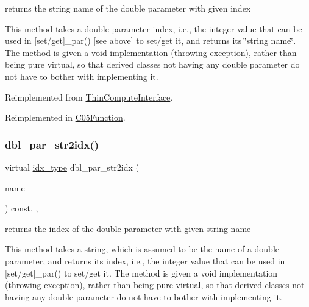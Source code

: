 returns the string name of the double parameter with given index 

This method takes a double parameter index, i.\+e., the integer value that can be used in \mbox{[}set/get\mbox{]}\+\_\+par() \mbox{[}see above\mbox{]} to set/get it, and returns its \char`\"{}string name\char`\"{}. The method is given a void implementation (throwing exception), rather than being pure virtual, so that derived classes not having any double parameter do not have to bother with implementing it. 

Reimplemented from \mbox{\hyperlink{class_s_m_spp__di__unipi__it_1_1_thin_compute_interface_a1be0e4ca13f9253674bc4fa7b67fe40e}{Thin\+Compute\+Interface}}.



Reimplemented in \mbox{\hyperlink{class_s_m_spp__di__unipi__it_1_1_c05_function_a93f1297e7910e91cc18b303376191026}{C05\+Function}}.

\mbox{\label{class_s_m_spp__di__unipi__it_1_1_function_a6d353ac3d1200d9bea89235da61bc4f3}} 
\subsubsection{\texorpdfstring{dbl\+\_\+par\+\_\+str2idx()}{dbl\_par\_str2idx()}}
{\footnotesize\ttfamily virtual \mbox{\hyperlink{class_s_m_spp__di__unipi__it_1_1_thin_compute_interface_aa3d710629ad8c434286726ad810c3b47}{idx\+\_\+type}} dbl\+\_\+par\+\_\+str2idx (\begin{DoxyParamCaption}\item[{const std\+::string \&}]{name }\end{DoxyParamCaption}) const\hspace{0.3cm}{\ttfamily [inline]}, {\ttfamily [override]}, {\ttfamily [virtual]}}



returns the index of the double parameter with given string name 

This method takes a string, which is assumed to be the name of a double parameter, and returns its index, i.\+e., the integer value that can be used in \mbox{[}set/get\mbox{]}\+\_\+par() to set/get it. The method is given a void implementation (throwing exception), rather than being pure virtual, so that derived classes not having any double parameter do not have to bother with implementing it. 

